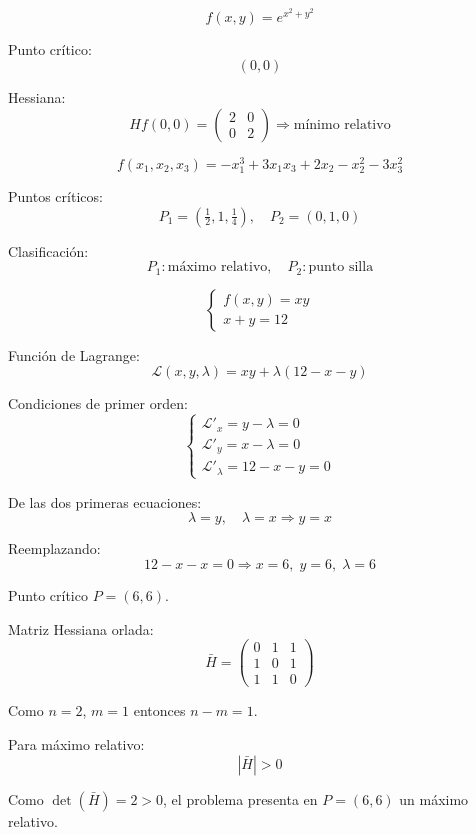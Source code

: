 \begin{Ejer}
\[
f(x,y)=e^{x^2+y^2}
\]

Punto cr\'itico:
\[
(0,0)
\]

Hessiana:
\[
Hf(0,0)=
\begin{pmatrix}
2 & 0\\
0 & 2
\end{pmatrix}
\Rightarrow \text{m\'inimo relativo}
\]
\end{Ejer}

\begin{Ejer}
\[
f(x_1,x_2,x_3)=-x_1^3+3x_1x_3+2x_2-x_2^2-3x_3^2
\]

Puntos cr\'iticos:
\[
P_1=\left(\tfrac12,1,\tfrac14\right),\quad P_2=(0,1,0)
\]

Clasificaci\'on:
\[
P_1:\text{m\'aximo relativo},\quad P_2:\text{punto silla}
\]
\end{Ejer}


\begin{Ejer}

\[
\begin{cases}
f(x,y)=xy\\
x+y=12
\end{cases}
\]

Funci\'on de Lagrange:
\[
\mathcal{L}(x,y,\lambda)=xy+\lambda(12-x-y)
\]

Condiciones de primer orden:
\[
\begin{cases}
\mathcal{L}'_x=y-\lambda=0\\
\mathcal{L}'_y=x-\lambda=0\\
\mathcal{L}'_\lambda=12-x-y=0
\end{cases}
\]

De las dos primeras ecuaciones:
\[
\lambda=y,\quad \lambda=x \Rightarrow y=x
\]

Reemplazando:
\[
12-x-x=0 \Rightarrow x=6,\; y=6,\; \lambda=6
\]

Punto cr\'itico $P=(6,6)$.

Matriz Hessiana orlada:
\[
\bar H=
\begin{pmatrix}
0 & 1 & 1\\
1 & 0 & 1\\
1 & 1 & 0
\end{pmatrix}
\]

Como $n=2$, $m=1$ entonces $n-m=1$.

Para m\'aximo relativo:
\[
|\bar H|>0
\]

Como $\det(\bar H)=2>0$, el problema presenta en $P=(6,6)$ un m\'aximo relativo.
\end{Ejer}


